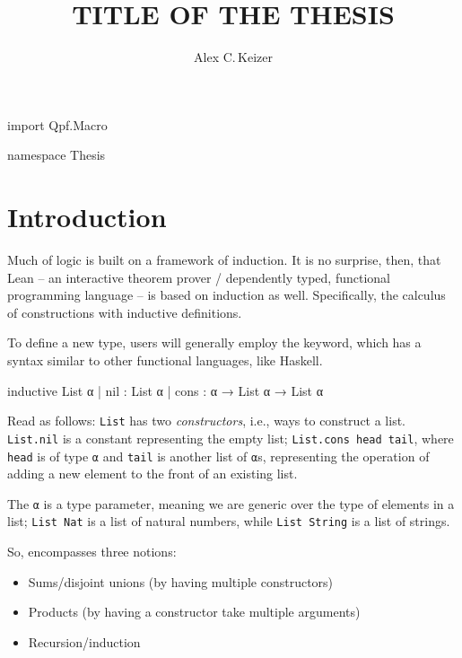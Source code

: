 \documentclass[titlepage]{report}
\newenvironment{leanhidden}{\expandafter\comment}{\expandafter\endcomment}
\newcommand\inductive{\lean{inductive}}
\begin{document}
%
%
\title{TITLE OF THE THESIS}
\author{Alex C.\,Keizer}
\maketitle


\begin{leanhidden}
    import Qpf.Macro

    namespace Thesis
\end{leanhidden}

%
%
\chapter{Introduction}
\label{ch:intro}

Much of logic is built on a framework of induction.
It is no surprise, then, that Lean -- an interactive theorem prover / dependently typed, functional programming
language -- is based on induction as well.
Specifically, the calculus of constructions with inductive definitions.

To define a new type, users will generally employ the \inductive keyword, which has a syntax similar
to other functional languages, like Haskell.

\begin{leancode}
    inductive List α 
    | nil  : List α
    | cons : α → List α → List α
\end{leancode}

Read as follows: \texttt{List} has two \emph{constructors}, i.e., ways to construct a list.
\texttt{List.nil} is a constant
representing the empty list; 
\texttt{List.cons head tail}, where \texttt{head} is of type \texttt{α} and \texttt{tail} is another list of \texttt{α}s, representing the operation of adding a new element to the front of
an existing list.

The \texttt{α} is a type parameter, meaning we are generic over the type of elements in a list;
\texttt{List Nat} is a list of natural numbers, while \texttt{List String} is a list of strings.

So, \inductive encompasses three notions: 
\begin{itemize}
    \item Sums/disjoint unions (by having multiple constructors)
    \item Products (by having a constructor take multiple arguments)
    \item Recursion/induction
\end{itemize}
\end{document}
